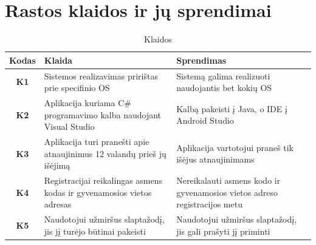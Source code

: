 \documentclass{VUMIFPSbakalaurinis}
\begin{document}
\section{Rastos klaidos ir jų sprendimai}
\begin{table}[H]\footnotesize
	\centering
	\caption{Klaidos}
	{
	\setlength{\arrayrulewidth}{0.25mm}
	{\begin{tabular}{|c|m{5.75cm}|m{5.75cm}|} \hline
		Kodas & Klaida & Sprendimas \\
		\hline
		\textbf{K1} & Sistemos realizavimas pririštas prie specifinio OS & Sistemą galima realizuoti naudojantis bet kokių OS \\
		\textbf{K2} & Aplikacija kuriama C\# programavimo kalba naudojant Visual Studio & Kalbą pakeisti į Java, o IDE į Android Studio \\
		\textbf{K3} & Aplikacija turi pranešti apie atnaujinimus 12 valandų prieš jų išėjimą & Aplikacija vartotojui praneš tik išėjus atnaujinimams \\
		\textbf{K4} & Registracijai reikalingas asmens kodas ir gyvenamosios vietos adresas & Nereikalauti asmens kodo ir gyvenamosios vietos adreso registracijos metu \\
		\textbf{K5} & Naudotojui užmiršus slaptažodį, jis jį turėjo būtinai pakeisti & Naudotojui užmiršus slaptažodį, jis gali prašyti jį priminti \\
		\hline
	\end{tabular}}
	}
	\label{tab:mistake table}
\end{table}
\end{document}
